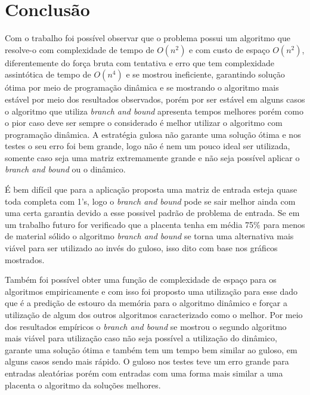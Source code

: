 \documentclass[10.9pt]{article}
\begin{document}
\section{Conclusão}
\label{sec:orga273154}

Com o trabalho foi possível observar que o problema possui um algoritmo que resolve-o com complexidade de tempo de \(O(n^2)\) e com custo de espaço \(O(n^2)\), diferentemente do força bruta com tentativa e erro que tem complexidade assintótica de tempo de \(O(n^4)\) e se mostrou ineficiente, garantindo solução ótima por meio de programação dinâmica e se mostrando o algoritmo mais estável por meio dos resultados observados, porém por ser estável em alguns casos o algoritmo que utiliza \emph{branch and bound} apresenta tempos melhores porém como o pior caso deve ser sempre o considerado é melhor utilizar o algoritmo com programação dinâmica. A estratégia gulosa não garante uma solução ótima e nos testes o seu erro foi bem grande, logo não é nem um pouco ideal ser utilizada, somente caso seja uma matriz extremamente grande e não seja possível aplicar o \emph{branch and bound} ou o dinâmico.

É bem difícil que para a aplicação proposta uma matriz de entrada esteja quase toda completa com 1's, logo o \emph{branch and bound} pode se sair melhor ainda com uma certa garantia devido a esse possivel padrão de problema de entrada. Se em um trabalho futuro for verificado que a placenta tenha em média 75\% para menos de material sólido o algoritmo \emph{branch and bound} se torna uma alternativa mais viável para ser utilizado ao invés do guloso, isso dito com base nos gráficos mostrados.

Também foi possível obter uma função de complexidade de espaço para os algoritmos empiricamente e com isso foi proposto uma utilização para esse dado que é a predição de estouro da memória para o algoritmo dinâmico e forçar a utilização de algum dos outros algoritmos caracterizado como o melhor. Por meio dos resultados empíricos o \emph{branch and bound} se mostrou o segundo algoritmo mais viável para utilização caso não seja possível a utilização do dinâmico, garante uma solução ótima e também tem um tempo bem similar ao guloso, em alguns casos sendo mais rápido. O guloso nos testes teve um erro grande para entradas aleatórias porém com entradas com uma forma mais similar a uma placenta o algoritmo da soluções melhores.





\end{document}
